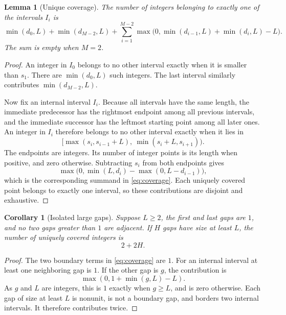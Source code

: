 \documentclass[11pt,letterpaper]{article}
\numberwithin{equation}{section}
\newtheorem{lemma}[theorem]{Lemma}
\newtheorem{corollary}[theorem]{Corollary}
\theoremstyle{definition}
\theoremstyle{remark}
\begin{document}
\begin{lemma}[Unique coverage]\label{lem:coverage}
The number of integers belonging to exactly one of the intervals $I_i$ is
\begin{equation}\label{eq:coverage}
 \min(d_0,L)+\min(d_{M-2},L)
 +\sum_{i=1}^{M-2}
 \max\!\bigl(0,\min(d_{i-1},L)+\min(d_i,L)-L\bigr).
\end{equation}
The sum is empty when $M=2$.
\end{lemma}
\begin{proof}
An integer in $I_0$ belongs to no other interval exactly when it is smaller
than $s_1$. There are $\min(d_0,L)$ such integers. The last interval similarly
contributes $\min(d_{M-2},L)$.

Now fix an internal interval $I_i$. Because all intervals have the same
length, the immediate predecessor has the rightmost endpoint among all
previous intervals, and the immediate successor has the leftmost starting
point among all later ones. An integer in $I_i$ therefore belongs to no other
interval exactly when it lies in
\[
 [\max(s_i,s_{i-1}+L),\ \min(s_i+L,s_{i+1})).
\]
The endpoints are integers. Its number of integer points is its length when
positive, and zero otherwise. Subtracting $s_i$ from both endpoints gives
\[
 \max\bigl(0,\min(L,d_i)-\max(0,L-d_{i-1})\bigr),
\]
which is the corresponding summand in \eqref{eq:coverage}. Each uniquely
covered point belongs to exactly one interval, so these contributions are
disjoint and exhaustive.
\end{proof}

\begin{corollary}[Isolated large gaps]\label{cor:isolated}
Suppose $L\ge2$, the first and last gaps are $1$, and no two gaps greater
than $1$ are adjacent. If $H$ gaps have size at least $L$, the number of
uniquely covered integers is
\begin{equation}\label{eq:isolated}
 2+2H.
\end{equation}
\end{corollary}
\begin{proof}
The two boundary terms in \eqref{eq:coverage} are $1$. For an internal
interval at least one neighboring gap is $1$. If the other gap is $g$, the
contribution is
\[
 \max(0,1+\min(g,L)-L).
\]
As $g$ and $L$ are integers, this is $1$ exactly when $g\ge L$, and is zero
otherwise. Each gap of size at least $L$ is nonunit, is not a boundary gap,
and borders two internal intervals. It therefore contributes twice.
\end{proof}
\end{document}
